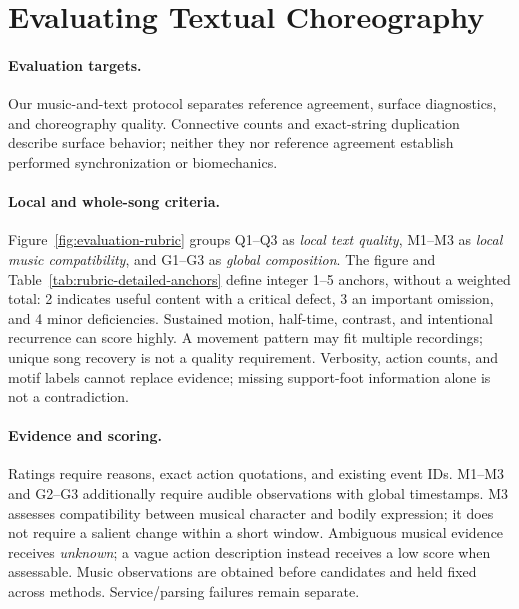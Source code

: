 \section{Evaluating Textual Choreography}
\label{sec:evaluation}




\paragraph{Evaluation targets.}
Our music-and-text protocol separates reference agreement, surface
diagnostics, and choreography quality. Connective counts and exact-string
duplication describe surface behavior; neither they nor reference
agreement establish performed synchronization or biomechanics.

\paragraph{Local and whole-song criteria.}
Figure~\ref{fig:evaluation-rubric} groups Q1--Q3 as \emph{local text
quality}, M1--M3 as \emph{local music compatibility}, and G1--G3 as
\emph{global composition}. The figure and
Table~\ref{tab:rubric-detailed-anchors} define integer 1--5 anchors, without
a weighted total: 2 indicates useful content with a critical defect,
3 an important omission, and 4 minor deficiencies. Sustained motion,
half-time, contrast, and intentional recurrence can score highly.
A movement pattern may fit multiple recordings; unique song recovery
is not a quality requirement.
Verbosity, action counts, and motif labels cannot replace evidence; missing support-foot
information alone is not a contradiction.

\paragraph{Evidence and scoring.}
Ratings require reasons, exact action quotations, and existing event IDs.
M1--M3 and G2--G3 additionally require audible observations with global
timestamps. M3 assesses compatibility between musical character and
bodily expression; it does not require a salient change within a short
window. Ambiguous musical evidence receives \emph{unknown}; a vague
action description instead receives a low score when assessable.
Music observations are obtained before candidates and held fixed across
methods. Service/parsing failures remain separate.

